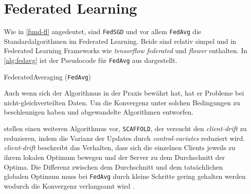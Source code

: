 \section{Federated Learning}\label{sec:rw-fl}

Wie in \autoref{fund-fl} angedeutet, sind \texttt{FedSGD} und vor allem \texttt{FedAvg} die Standardalgorithmen im Federated Learning. Beide sind relativ simpel und in Federated Learning Frameworks wie \textit{tensorflow federated} und \textit{flower} enthalten. In \autoref{alg:fedavg} ist der Pseudocode für \texttt{FedAvg} aus \cite{mcmahan:2016} dargestellt. 


\begin{algorithm}[tb]
	\caption{FederatedAveraging (\texttt{FedAvg})}
	\label{alg:fedavg}
\end{algorithm}

Auch wenn sich der Algorithmus in der Praxis bewährt hat\cite{hard:2018, ramaswamy:2020}, hat er Probleme bei nicht-gleichverteilten Daten. Um die Konvergenz unter solchen Bedingungen zu beschleunigen haben \textcite{karimireddy:2020} und \textcite{li:2020} abgewandelte Algorithmen entworfen.

\textcite{karimireddy:2020} stellen einen weiteren Algorithmus vor, \texttt{SCAFFOLD}, der versucht den \textit{client-drift} zu reduzieren, indem die Varianz der Updates durch \textit{control-variates} reduziert wird. \textit{client-drift} beschreibt das Verhalten, dass sich die einzelnen Clients jeweils zu ihrem lokalen Optimum bewegen und der Server zu dem Durchschnitt der Optima. Die Differenz zwischen dem Durchschnitt und dem tatsächlichen globalen Optimum muss bei \texttt{FedAvg} durch kleine Schritte gering gehalten werden wodurch die Konvergenz verlangsamt wird \parencite[p.4]{karimireddy:2020}.

